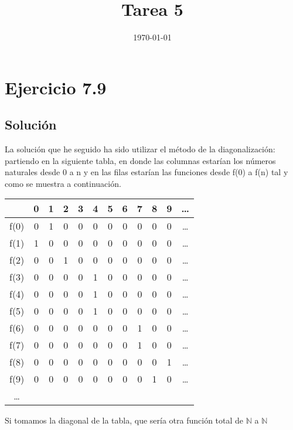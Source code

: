 \documentclass[11pt, a4paper, titlepage]{article}
\begin{document}
\title{Tarea 5}
\date{\today}
\maketitle
\newpage

\section*{Ejercicio 7.9}
\subsection*{Solución}
La solución que he seguido ha sido utilizar el método de la diagonalización:
partiendo en la siguiente tabla, en donde las columnas estarían los números
naturales desde 0 a n y en las filas estarían las funciones desde f(0) a f(n)
tal y como se muestra a continuación.

\begin{center}
  \begin{tabular}{| c | c c c c c c c c c c c|}
    \hline
    \, & 0 & 1 & 2 & 3 & 4 & 5 & 6 & 7 & 8 & 9 & \ldots \\ \hline
    f(0) & 0 & 1 & 0 & 0 & 0 & 0 & 0 & 0 & 0 & 0 & \ldots \\ \hline
    f(1) & 1 & 0 & 0 & 0 & 0 & 0 & 0 & 0 & 0 & 0 & \ldots \\ \hline
    f(2) & 0 & 0 & 1 & 0 & 0 & 0 & 0 & 0 & 0 & 0 & \ldots \\ \hline
    f(3) & 0 & 0 & 0 & 0 & 1 & 0 & 0 & 0 & 0 & 0 & \ldots \\ \hline
    f(4) & 0 & 0 & 0 & 0 & 1 & 0 & 0 & 0 & 0 & 0 & \ldots \\ \hline
    f(5) & 0 & 0 & 0 & 0 & 1 & 0 & 0 & 0 & 0 & 0 & \ldots \\ \hline
    f(6) & 0 & 0 & 0 & 0 & 0 & 0 & 0 & 1 & 0 & 0 & \ldots \\ \hline
    f(7) & 0 & 0 & 0 & 0 & 0 & 0 & 0 & 1 & 0 & 0 & \ldots \\ \hline
    f(8) & 0 & 0 & 0 & 0 & 0 & 0 & 0 & 0 & 0 & 1 & \ldots \\ \hline
    f(9) & 0 & 0 & 0 & 0 & 0 & 0 & 0 & 0 & 1 & 0 & \ldots \\ \hline
    \ldots
    
  \end{tabular}
\end{center}

Si tomamos la diagonal de la tabla, que sería otra función total de $\mathbb{N}$ a
$\mathbb{N}$
\end{document}
